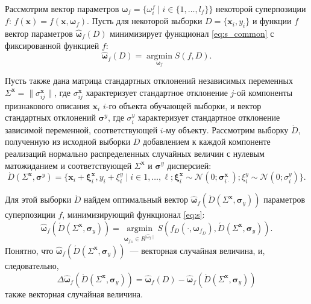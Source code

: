 \documentclass[12pt,a4paper]{article}
\theoremstyle{definition}
\begin{document}
Рассмотрим вектор параметров
$\boldsymbol{\omega}_f = \{ \omega_i^f \mid i \in \{ 1, \dots, l_f \} \}$
некоторой суперпозиции $f$: $f(\mathbf{x}) = f(\mathbf{x}, \boldsymbol{\omega}_f)$.
Пусть для некоторой выборки $D = \{ \mathbf{x}_i, y_i \}$ и функции
$f$ вектор параметров $\hat{\boldsymbol{\omega}}_f(D)$ минимизирует
функционал \eqref{eq:s_common} с фиксированной функцией $f$:
\[
  \hat{\boldsymbol{\omega}}_f(D) = \mathop{\arg \min}\limits_{\boldsymbol{\omega}_f} S(f, D).
\]

Пусть также дана матрица стандартных отклонений
независимых переменных $\Sigma^{\mathbf{x}} = \| \sigma^{\mathbf{x}}_{ij} \|$,
где $\sigma^{\mathbf{x}}_{ij}$ характеризует стандартное отклонение $j$-ой
компоненты признакового описания $\mathbf{x}_i$ $i$-го объекта обучающей выборки,
и вектор стандартных отклонений $\boldsymbol{\sigma}^y$, где $\sigma^y_i$
характеризует стандартное отклонение зависимой переменной, соответствующей
$i$-му объекту.
Рассмотрим выборку $\acute{D}$, полученную из исходной выборки $D$
добавлением к каждой компоненте реализаций нормально распределенных
случайных величин с нулевым матожиданием и соответствующей
$\Sigma^{\mathbf{x}}$ и $\boldsymbol{\sigma}^y$ дисперсией:
\begin{equation}
  \acute{D}(\Sigma^{\mathbf{x}}, \boldsymbol{\sigma}^y) = \{ \mathbf{x}_i + \boldsymbol{\xi}^{\mathbf{x}}_i, y_i + \xi^y_i \mid i \in 1, \dots, \ell; \boldsymbol{\xi}^{\mathbf{x}}_i \sim \mathcal{N}(0; \boldsymbol{\sigma}^{\mathbf{x}}_{i \cdot}); \xi^y_i \sim \mathcal{N}(0; \sigma^y_i) \}.
  \label{eq:d_acute}
\end{equation}

Для этой выборки $\acute{D}$ найдем оптимальный вектор $\hat{\boldsymbol{\omega}}_f (\acute{D} (\Sigma^{\mathbf{x}}, \boldsymbol{\sigma}_y))$
параметров суперпозиции $f$, минимизирующий функционал \eqref{eq:s}:
\begin{equation}
  \hat{\boldsymbol{\omega}}_f (\acute{D} (\Sigma^{\mathbf{x}}, \boldsymbol{\sigma}_y)) = \mathop{\arg \min}\limits_{\boldsymbol{\omega}_{f_D} \in R^{\mid \hat{\boldsymbol{\omega}}_f \mid}} S (f_D (\cdot, \boldsymbol{\omega}_{f_D}), \acute{D} (\Sigma^{\mathbf{x}}, \boldsymbol{\sigma}_y)).
  \label{eq:hat_omega}
\end{equation}
Понятно, что $\hat{\boldsymbol{\omega}}_f (\acute{D} (\Sigma^{\mathbf{x}}, \boldsymbol{\sigma}_y))$~---
векторная случайная величина, и, следовательно,
\[
  \Delta\hat{\boldsymbol{\omega}}_f(\acute{D} (\Sigma^{\mathbf{x}}, \boldsymbol{\sigma}_y) ) = \hat{\boldsymbol{\omega}}_f(D) - \hat{\boldsymbol{\omega}}_f (\acute{D} (\Sigma^{\mathbf{x}}, \boldsymbol{\sigma}_y))
\]
также векторная случайная величина.
\end{document}
